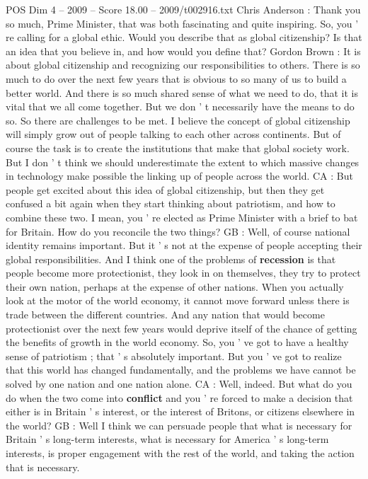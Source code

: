 \begin{textsample}{POS Dim 4 – 2009 – Score 18.00 – 2009/t002916.txt}  \label{ex:f4_pos_046}
Chris Anderson : Thank you so much, Prime Minister, that was both fascinating and quite inspiring.
So, you ' re calling for a global ethic.
Would you describe that as global citizenship?
Is that an idea that you believe in, and how would you define that?
Gordon Brown : It is about global citizenship and recognizing our responsibilities to others.
There is so much to do over the next few years that is obvious to so many of us to build a better world.
And there is so much shared sense of what we need to do, that it is vital that we all come together.
But we don ' t necessarily have the means to do so.
So there are challenges to be met.
I believe the concept of global citizenship will simply grow out of people talking to each other across continents.
But of course the task is to create the institutions that make that global society work.
But I don ' t think we should underestimate the extent to which massive changes in technology make possible the linking up of people across the world.
CA : But people get excited about this idea of global citizenship, but then they get confused a bit again when they start thinking about patriotism, and how to combine these two.
I mean, you ' re elected as Prime Minister with a brief to bat for Britain.
How do you reconcile the two things?
GB : Well, of course national identity remains important.
But it ' s not at the expense of people accepting their global responsibilities.
And I think one of the problems of \textbf{recession} is that people become more protectionist, they look in on themselves, they try to protect their own nation, perhaps at the expense of other nations.
When you actually look at the motor of the world economy, it cannot move forward unless there is trade between the different countries.
And any nation that would become protectionist over the next few years would deprive itself of the chance of getting the benefits of growth in the world economy.
So, you ' ve got to have a healthy sense of patriotism ; that ' s absolutely important.
But you ' ve got to realize that this world has changed fundamentally, and the problems we have cannot be solved by one nation and one nation alone.
CA : Well, indeed.
But what do you do when the two come into \textbf{conflict} and you ' re forced to make a decision that either is in Britain ' s interest, or the interest of Britons, or citizens elsewhere in the world?
GB : Well I think we can persuade people that what is necessary for Britain ' s long-term interests, what is necessary for America ' s long-term interests, is proper engagement with the rest of the world, and taking the action that is necessary.

\end{textsample}
